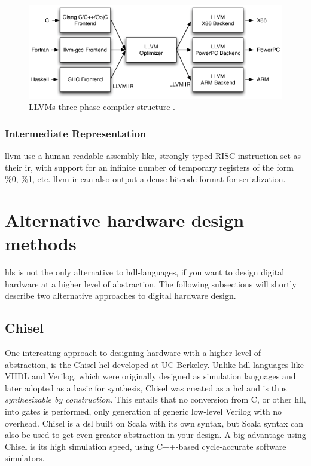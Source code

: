 \begin{figure}[hbpt]
\centering
\includegraphics[width=\textwidth]{../figs/LLVMCompiler.png}
\caption{\label{fig:llvmcompiler}LLVMs three-phase compiler structure \cite{llvmarch}.}
\end{figure}

\subsubsection{Intermediate Representation}
\gls{llvm} use a human readable assembly-like, strongly typed RISC instruction set as their \gls{ir}, with support for an infinite number of temporary registers of the form \%0, \%1, etc. \gls{llvm} \gls{ir} can also output a dense bitcode format for serialization.

\section{Alternative hardware design methods}
\gls{hls} is not the only alternative to \gls{hdl}-languages, if you want to design digital hardware at a higher level of abstraction. The following subsections will shortly describe two alternative approaches to digital hardware design. 
\subsection{Chisel}
One interesting approach to designing hardware with a higher level of abstraction, is the Chisel \gls{hcl} \cite{bachrach2012chisel} developed at UC Berkeley. Unlike \gls{hdl} languages like VHDL and Verilog, which were originally designed as simulation languages and later adopted as a basic for synthesis, Chisel was created as a \gls{hcl} and is thus \textit{synthesizable by construction}. This entails that no conversion from C, or other \gls{hll}, into gates is performed, only generation of generic low-level Verilog with no overhead. Chisel is a \gls{dsl} built on Scala \cite{odersky2004overview} with its own syntax, but Scala syntax can also be used to get even greater abstraction in your design. A big advantage using Chisel is its high simulation speed, using C++-based cycle-accurate software simulators.


